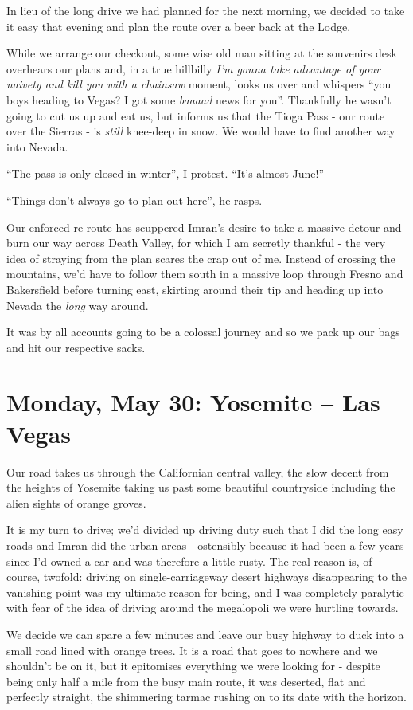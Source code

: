 \documentclass[a5paper,titlepage,11pt]{book}
\begin{document}
In lieu of the long drive we had planned for the next morning, we decided to take it easy that evening and plan the route over a beer back at the Lodge.

While we arrange our checkout, some wise old man sitting at the souvenirs desk overhears our plans and, in a true hillbilly \emph{I'm gonna take advantage of your naivety and kill you with a chainsaw} moment, looks us over and whispers ``you boys heading to Vegas? I got some \emph{baaaad} news for you''.  Thankfully he wasn't going to cut us up and eat us, but informs us that the Tioga Pass - our route over the Sierras - is \emph{still} knee-deep in snow.  We would have to find another way into Nevada.

``The pass is only closed in winter'', I protest.  ``It's almost June!''

``Things don't always go to plan out here'', he rasps.

Our enforced re-route has scuppered Imran's desire to take a massive detour and burn our way across Death Valley, for which I am secretly thankful - the very idea of straying from the plan scares the crap out of me.  Instead of crossing the mountains, we'd have to follow them south in a massive loop through Fresno and Bakersfield before turning east, skirting around their tip and heading up into Nevada the \emph{long} way around.

It was by all accounts going to be a colossal journey and so we pack up our bags and hit our respective sacks.

\chapter[Yosemite -- Las Vegas]{Monday, May 30: Yosemite -- Las Vegas}
Our road takes us through the Californian central valley, the slow decent from the heights of Yosemite taking us past some beautiful countryside including the alien sights of orange groves.

It is my turn to drive; we'd divided up driving duty such that I did the long easy roads and Imran did the urban areas - ostensibly because it had been a few years since I'd owned a car and was therefore a little rusty.  The real reason is, of course, twofold: driving on single-carriageway desert highways disappearing to the vanishing point was my ultimate reason for being, and I was completely paralytic with fear of the idea of driving around the megalopoli we were hurtling towards.

We decide we can spare a few minutes and leave our busy highway to duck into a small road lined with orange trees.  It is a road that goes to nowhere and we shouldn't be on it, but it epitomises everything we were looking for - despite being only half a mile from the busy main route, it was deserted, flat and perfectly straight, the shimmering tarmac rushing on to its date with the horizon.
\end{document}
